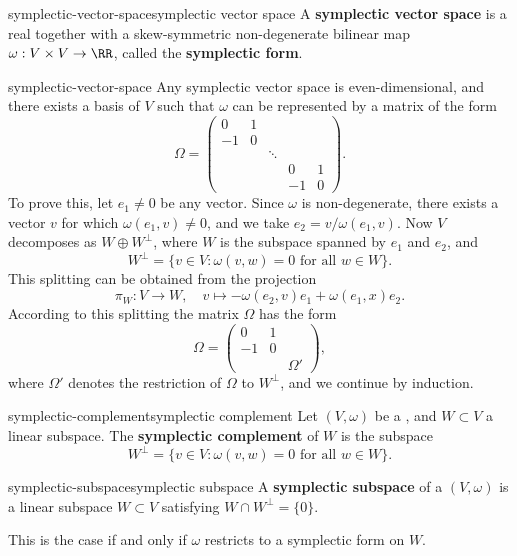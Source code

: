 \begin{topic}{symplectic-vector-space}{symplectic vector space}
    A \textbf{symplectic vector space} is a real  together with a skew-symmetric non-degenerate bilinear map $\omega : V \times V \to \RR$, called the \textbf{symplectic form}.
\end{topic}

\begin{example}{symplectic-vector-space}
    Any symplectic vector space is even-dimensional, and there exists a basis of $V$ such that $\omega$ can be represented by a matrix of the form
    \[ \Omega = \begin{pmatrix} 0 & 1 & & & \\ -1 & 0 & & & \\ & & \ddots & & \\ & & & 0 & 1 \\ & & & -1 & 0 \end{pmatrix} . \]
    To prove this, let $e_1 \ne 0$ be any vector. Since $\omega$ is non-degenerate, there exists a vector $v$ for which $\omega(e_1, v) \ne 0$, and we take $e_2 = v/\omega(e_1, v)$. Now $V$ decomposes as $W \oplus W^\perp$, where $W$ is the subspace spanned by $e_1$ and $e_2$, and
    \[ W^\perp = \{ v \in V : \omega(v, w) = 0 \text{ for all } w \in W \} . \]
    This splitting can be obtained from the projection
    \[ \pi_W : V \to W, \quad v \mapsto - \omega(e_2, v) e_1 + \omega(e_1, x) e_2 . \]
    According to this splitting the matrix $\Omega$ has the form
    \[ \Omega = \begin{pmatrix} 0 & 1 & \\ -1 & 0 & \\ & & \Omega' \end{pmatrix} , \]
    where $\Omega'$ denotes the restriction of $\Omega$ to $W^\perp$, and we continue by induction.
\end{example}

\begin{topic}{symplectic-complement}{symplectic complement}
    Let $(V, \omega)$ be a , and $W \subset V$ a linear subspace. The \textbf{symplectic complement} of $W$ is the subspace
    \[ W^\perp = \{ v \in V : \omega(v, w) = 0 \text{ for all } w \in W \} . \]
\end{topic}

\begin{topic}{symplectic-subspace}{symplectic subspace}
    A \textbf{symplectic subspace} of a  $(V, \omega)$ is a linear subspace $W \subset V$ satisfying $W \cap W^\perp = \{ 0 \}$.
    
    This is the case if and only if $\omega$ restricts to a symplectic form on $W$.
\end{topic}

